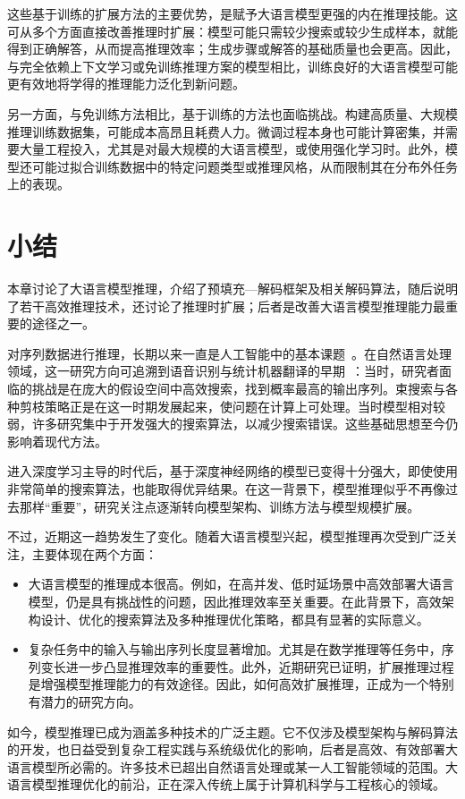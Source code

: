 这些基于训练的扩展方法的主要优势，是赋予大语言模型更强的内在推理技能。这可从多个方面直接改善推理时扩展：模型可能只需较少搜索或较少生成样本，就能得到正确解答，从而提高推理效率；生成步骤或解答的基础质量也会更高。因此，与完全依赖上下文学习或免训练推理方案的模型相比，训练良好的大语言模型可能更有效地将学得的推理能力泛化到新问题。

另一方面，与免训练方法相比，基于训练的方法也面临挑战。构建高质量、大规模推理训练数据集，可能成本高昂且耗费人力。微调过程本身也可能计算密集，并需要大量工程投入，尤其是对最大规模的大语言模型，或使用强化学习时。此外，模型还可能过拟合训练数据中的特定问题类型或推理风格，从而限制其在分布外任务上的表现。


\section{小结}

本章讨论了大语言模型推理，介绍了预填充—解码框架及相关解码算法，随后说明了若干高效推理技术，还讨论了推理时扩展；后者是改善大语言模型推理能力最重要的途径之一。

对序列数据进行推理，长期以来一直是人工智能中的基本课题~\cite{wozengraft-and-reiffen:1961,viterbi:1967error,forney-etal:1972maximum}。在自然语言处理领域，这一研究方向可追溯到语音识别与统计机器翻译的早期~\cite{Koehn:2010}：当时，研究者面临的挑战是在庞大的假设空间中高效搜索，找到概率最高的输出序列。束搜索与各种剪枝策略正是在这一时期发展起来，使问题在计算上可处理。当时模型相对较弱，许多研究集中于开发强大的搜索算法，以减少搜索错误。这些基础思想至今仍影响着现代方法。

进入深度学习主导的时代后，基于深度神经网络的模型已变得十分强大，即使使用非常简单的搜索算法，也能取得优异结果。在这一背景下，模型推理似乎不再像过去那样“重要”，研究关注点逐渐转向模型架构、训练方法与模型规模扩展。

不过，近期这一趋势发生了变化。随着大语言模型兴起，模型推理再次受到广泛关注，主要体现在两个方面：

\begin{itemize}
\item \vspace{0.5em} 大语言模型的推理成本很高。例如，在高并发、低时延场景中高效部署大语言模型，仍是具有挑战性的问题，因此推理效率至关重要。在此背景下，高效架构设计、优化的搜索算法及多种推理优化策略，都具有显著的实际意义。
\item \vspace{0.3em} 复杂任务中的输入与输出序列长度显著增加。尤其是在数学推理等任务中，序列变长进一步凸显推理效率的重要性。此外，近期研究已证明，扩展推理过程是增强模型推理能力的有效途径。因此，如何高效扩展推理，正成为一个特别有潜力的研究方向。
\end{itemize}
\vspace{0.5em}

如今，模型推理已成为涵盖多种技术的广泛主题。它不仅涉及模型架构与解码算法的开发，也日益受到复杂工程实践与系统级优化的影响，后者是高效、有效部署大语言模型所必需的。许多技术已超出自然语言处理或某一人工智能领域的范围。大语言模型推理优化的前沿，正在深入传统上属于计算机科学与工程核心的领域。

